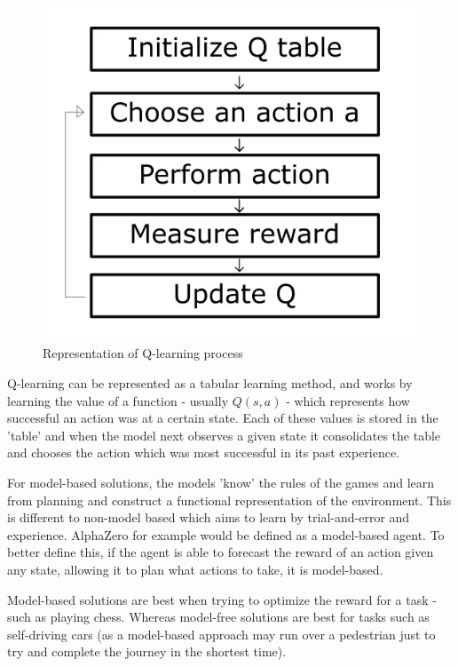 \documentclass{article}
\begin{document}
    \begin{figure}
        \centering
        \includegraphics[scale=0.5]{qlearning.PNG}
        \caption{Representation of Q-learning process}
    \end{figure}
    Q-learning can be represented as a tabular learning method, and works by learning the value of a function - usually $Q(s, a)$ - which represents how successful an action was at
    a certain state. Each of these values is stored in the 'table' and when the model next observes a given state it consolidates the table and chooses the action which was most
    successful in its past experience.

    For model-based solutions, the models 'know' the rules of the games and learn from planning and construct a functional representation of the environment. This is different to non-model
    based which aims to learn by trial-and-error and experience. AlphaZero for example would be defined as a model-based agent. To better define this, if the agent is able to forecast the reward
    of an action given any state, allowing it to plan what actions to take, it is model-based.

    Model-based solutions are best when trying to optimize the reward for a task - such as playing chess. Whereas model-free solutions are best for tasks such as self-driving cars (as a model-based
    approach may run over a pedestrian just to try and complete the journey in the shortest time).
\end{document}
